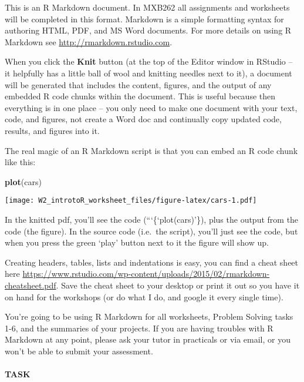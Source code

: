 \documentclass[]{article}
\newenvironment{Shaded}{\begin{snugshade}}{\end{snugshade}}
\newcommand{\KeywordTok}[1]{\textcolor[rgb]{0.13,0.29,0.53}{\textbf{#1}}}
\newcommand{\NormalTok}[1]{#1}
\let\oldparagraph\paragraph
\renewcommand{\paragraph}[1]{\oldparagraph{#1}\mbox{}}
\begin{document}
This is an R Markdown document. In MXB262 all assignments and worksheets
will be completed in this format. Markdown is a simple formatting syntax
for authoring HTML, PDF, and MS Word documents. For more details on
using R Markdown see \url{http://rmarkdown.rstudio.com}.

When you click the \textbf{Knit} button (at the top of the Editor window
in RStudio -- it helpfully has a little ball of wool and knitting
needles next to it), a document will be generated that includes the
content, figures, and the output of any embedded R code chunks within
the document. This is useful because then everything is in one place --
you only need to make one document with your text, code, and figures,
not create a Word doc and continually copy updated code, results, and
figures into it.

The real magic of an R Markdown script is that you can embed an R code
chunk like this:

\begin{Shaded}
\begin{Highlighting}[]
\KeywordTok{plot}\NormalTok{(cars)}
\end{Highlighting}
\end{Shaded}

\texttt{[image: W2\_introtoR\_worksheet\_files/figure-latex/cars-1.pdf]}

In the knitted pdf, you'll see the code (```\{`plot(cars)'\}), plus the
output from the code (the figure). In the source code (i.e.~the script),
you'll just see the code, but when you press the green `play' button
next to it the figure will show up.

Creating headers, tables, lists and indentations is easy, you can find a
cheat sheet here
\url{https://www.rstudio.com/wp-content/uploads/2015/02/rmarkdown-cheatsheet.pdf}.
Save the cheat sheet to your desktop or print it out so you have it on
hand for the workshops (or do what I do, and google it every single
time).

You're going to be using R Markdown for all worksheets, Problem Solving
tasks 1-6, and the summaries of your projects. If you are having
troubles with R Markdown at any point, please ask your tutor in
practicals or via email, or you won't be able to submit your assessment.

\hypertarget{task}{%
\paragraph{TASK}\label{task}}
\end{document}
